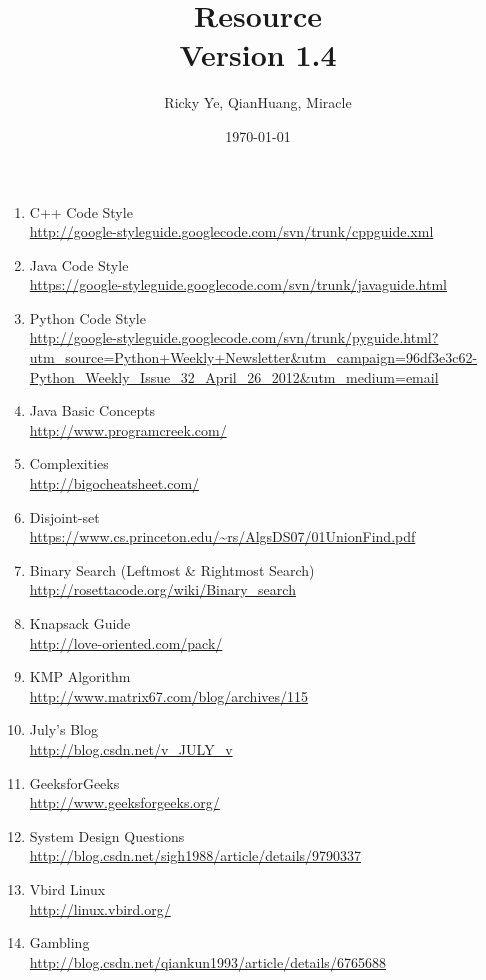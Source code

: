 \documentclass[paper=a4, fontsize=11pt]{scrartcl} %
\begin{document}
\title{Resource\\\textnormal{\small{Version 1.4}}}
\author{Ricky Ye, QianHuang, Miracle}
\date{\today}
\maketitle

\begin{enumerate}[label=\upshape(\arabic*\upshape)]
  \item C++ Code Style\\ \url{http://google-styleguide.googlecode.com/svn/trunk/cppguide.xml}
  \item Java Code Style\\ \url{https://google-styleguide.googlecode.com/svn/trunk/javaguide.html}
  \item Python Code Style\\ \url{http://google-styleguide.googlecode.com/svn/trunk/pyguide.html?utm_source=Python+Weekly+Newsletter&utm_campaign=96df3e3c62-Python_Weekly_Issue_32_April_26_2012&utm_medium=email}
  \item Java Basic Concepts\\ \url{http://www.programcreek.com/}
  \item Complexities\\ \url{http://bigocheatsheet.com/}
  \item Disjoint-set\\ \url{https://www.cs.princeton.edu/~rs/AlgsDS07/01UnionFind.pdf}
  \item Binary Search (Leftmost \& Rightmost Search)\\ \url{http://rosettacode.org/wiki/Binary_search} 
  \item Knapsack Guide\\ \url{http://love-oriented.com/pack/}
  \item KMP Algorithm\\ \url{http://www.matrix67.com/blog/archives/115}
  \item July's Blog\\ \url{http://blog.csdn.net/v_JULY_v}
  \item GeeksforGeeks\\ \url{http://www.geeksforgeeks.org/}
  \item System Design Questions\\ \url{http://blog.csdn.net/sigh1988/article/details/9790337}
  \item Vbird Linux\\ \url{http://linux.vbird.org/}
  \item Gambling\\ \url{http://blog.csdn.net/qiankun1993/article/details/6765688}
\end{enumerate}
\end{document}
